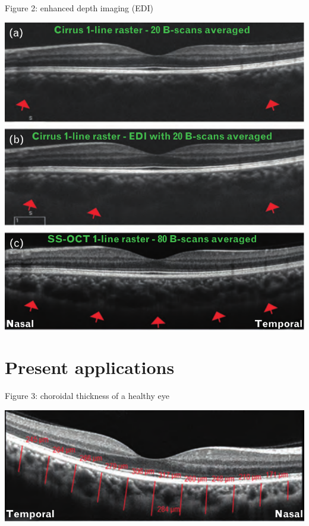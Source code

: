 \documentclass{beamer}
\begin{document}
\begin{frame}{Figure 2: enhanced depth imaging (EDI)}
    \begin{center}
        \includegraphics[height=0.8\textheight]{2.png}
    \end{center}
\end{frame}

\section{Present applications}
\begin{frame}{Figure 3: choroidal thickness of a healthy eye}
    \begin{center}
        \includegraphics[width=\textwidth]{3.png}
    \end{center}
\end{frame}
\end{document}
